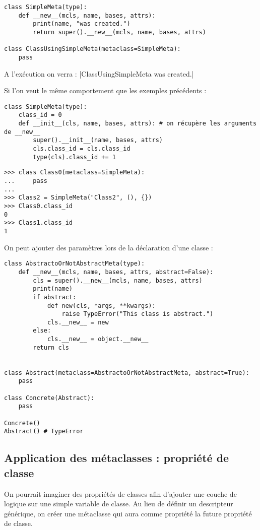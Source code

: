 \begin{verbatim}
class SimpleMeta(type):
    def __new__(mcls, name, bases, attrs):
        print(name, "was created.")
        return super().__new__(mcls, name, bases, attrs)

class ClassUsingSimpleMeta(metaclass=SimpleMeta):
    pass
\end{verbatim}

A l'exécution on verra : |ClassUsingSimpleMeta was created.|

Si l'on veut le même comportement que les exemples précédents :

\begin{verbatim}
class SimpleMeta(type):
    class_id = 0
    def __init__(cls, name, bases, attrs): # on récupère les arguments de __new__
        super().__init__(name, bases, attrs)
        cls.class_id = cls.class_id
        type(cls).class_id += 1
\end{verbatim}

\begin{verbatim}
>>> class Class0(metaclass=SimpleMeta):
...     pass
...
>>> Class2 = SimpleMeta("Class2", (), {})
>>> Class0.class_id
0
>>> Class1.class_id
1
\end{verbatim}

On peut ajouter des paramètres lors de la déclaration d'une classe :

\begin{verbatim}
class AbstractoOrNotAbstractMeta(type):
    def __new__(mcls, name, bases, attrs, abstract=False):
        cls = super().__new__(mcls, name, bases, attrs)
        print(name)
        if abstract:
            def new(cls, *args, **kwargs):
                raise TypeError("This class is abstract.")
            cls.__new__ = new
        else:
            cls.__new__ = object.__new__
        return cls


class Abstract(metaclass=AbstractoOrNotAbstractMeta, abstract=True):
    pass

class Concrete(Abstract):
    pass

Concrete()
Abstract() # TypeError
\end{verbatim}

\subsection{Application des métaclasses : propriété de classe}

On pourrait imaginer des propriétés de classes afin d'ajouter une couche de logique sur une simple variable de classe. Au lieu de définir un descripteur générique, on créer une métaclasse qui aura comme propriété la future propriété de classe.

